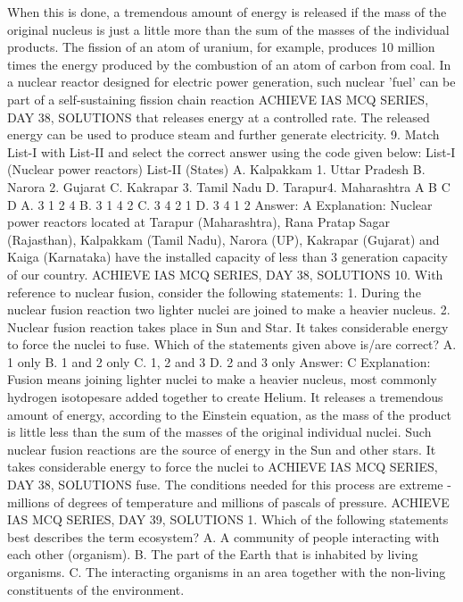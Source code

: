 When this is done, a tremendous amount of energy is released if the
mass of the original nucleus is just a little more than the sum of the
masses of the individual products.
The fission of an atom of uranium, for example, produces 10 million
times the energy produced by the combustion of an atom of carbon
from coal.
In a nuclear reactor designed for electric power generation, such
nuclear 'fuel' can be part of a self-sustaining fission chain reaction
ACHIEVE IAS MCQ SERIES, DAY 38, SOLUTIONS
that releases energy at a controlled rate. The released energy can
be used to produce steam and further generate electricity.
9. Match List-I with List-II and select the correct answer using
the code given below:
List-I (Nuclear power reactors) List-II (States)
A. Kalpakkam 1. Uttar Pradesh
B. Narora 2. Gujarat
C. Kakrapar 3. Tamil Nadu
D. Tarapur4. Maharashtra
A B C D
A. 3 1 2 4
B. 3 1 4 2
C. 3 4 2 1
D. 3 4 1 2
Answer: A
Explanation: Nuclear power reactors located at Tarapur
(Maharashtra), Rana Pratap Sagar (Rajasthan), Kalpakkam (Tamil
Nadu), Narora (UP), Kakrapar (Gujarat) and Kaiga (Karnataka) have
the installed capacity of less than 3%
generation capacity of our country.
ACHIEVE IAS MCQ SERIES, DAY 38, SOLUTIONS
10. With reference to nuclear fusion, consider the following
statements:
1. During the nuclear fusion reaction two lighter nuclei are joined to
make a heavier nucleus.
2. Nuclear fusion reaction takes place in Sun and Star. It takes
considerable energy to force the nuclei to fuse.
Which of the statements given above is/are correct?
A. 1 only
B. 1 and 2 only
C. 1, 2 and 3
D. 2 and 3 only
Answer: C
Explanation: Fusion means joining lighter nuclei to make a heavier
nucleus, most commonly hydrogen isotopesare added together to
create Helium.
It releases a tremendous amount of energy, according to the
Einstein equation, as the mass of the product is little less than the
sum of the masses of the original individual nuclei.
Such nuclear fusion reactions are the source of energy in the Sun
and other stars. It takes considerable energy to force the nuclei to
ACHIEVE IAS MCQ SERIES, DAY 38, SOLUTIONS
fuse. The conditions needed for this process are extreme - millions
of degrees of temperature and millions of pascals of pressure.
ACHIEVE IAS MCQ SERIES, DAY 39, SOLUTIONS
1. Which of the following statements best describes the term
ecosystem?
A. A community of people interacting with each other (organism).
B. The part of the Earth that is inhabited by living organisms.
C. The interacting organisms in an area together with the non-living
constituents of the environment.
